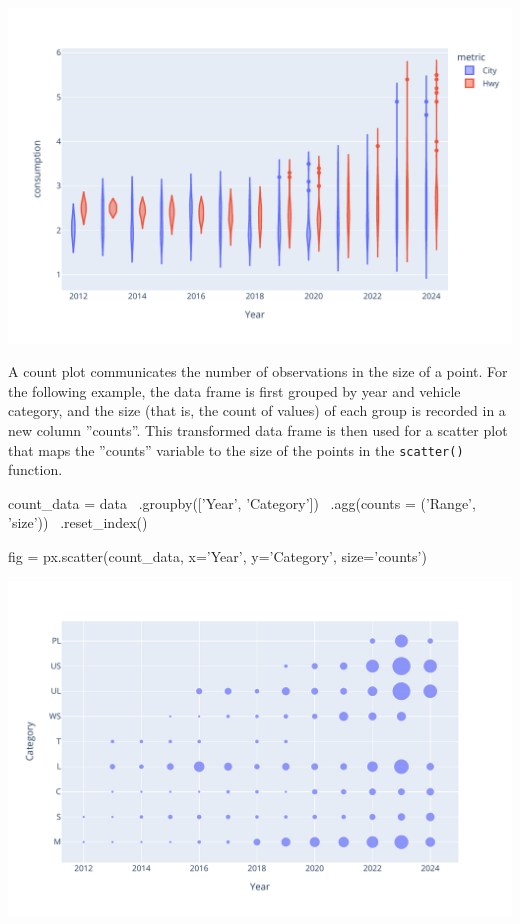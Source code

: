 \begin{center}
  \includegraphics[width=.8\textwidth]{px.fuel.violin.pdf}
\end{center}

A count plot communicates the number of observations in the size of a point. For the following example, the data frame is first grouped by year and vehicle category, and the size (that is, the count of values) of each group is recorded in a new column ''counts''. This transformed data frame is then used for a scatter plot that maps the ''counts'' variable to the size of the points in the \texttt{scatter()} function.

\begin{samepage}
\begin{pythoncode}
count_data = data \
   .groupby(['Year', 'Category']) \
   .agg(counts = ('Range', 'size')) \
   .reset_index()

fig = px.scatter(count_data, x='Year', y='Category', size='counts')
\end{pythoncode}
\end{samepage}

\begin{center}
  \includegraphics[width=.8\textwidth]{px.fuel.count.pdf}
\end{center}


